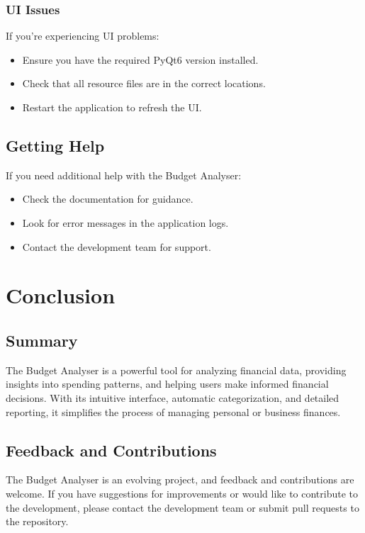 \documentclass[11pt,a4paper]{report}
\begin{document}
\subsection{UI Issues}
If you're experiencing UI problems:
\begin{itemize}
    \item Ensure you have the required PyQt6 version installed.
    \item Check that all resource files are in the correct locations.
    \item Restart the application to refresh the UI.
\end{itemize}

\section{Getting Help}
If you need additional help with the Budget Analyser:
\begin{itemize}
    \item Check the documentation for guidance.
    \item Look for error messages in the application logs.
    \item Contact the development team for support.
\end{itemize}

\chapter{Conclusion}

\section{Summary}
The Budget Analyser is a powerful tool for analyzing financial data, providing insights into spending patterns, and helping users make informed financial decisions. With its intuitive interface, automatic categorization, and detailed reporting, it simplifies the process of managing personal or business finances.

\section{Feedback and Contributions}
The Budget Analyser is an evolving project, and feedback and contributions are welcome. If you have suggestions for improvements or would like to contribute to the development, please contact the development team or submit pull requests to the repository.

\appendix
\end{document}
